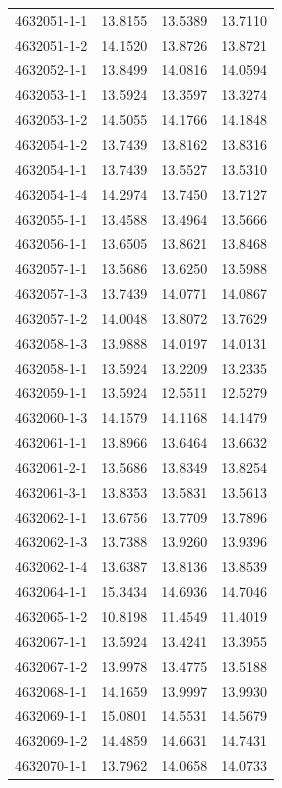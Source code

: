 \begin{longtable}{lrrr}
4632051-1-1 & 13.8155 & 13.5389 & 13.7110 \\
4632051-1-2 & 14.1520 & 13.8726 & 13.8721 \\
4632052-1-1 & 13.8499 & 14.0816 & 14.0594 \\
4632053-1-1 & 13.5924 & 13.3597 & 13.3274 \\
4632053-1-2 & 14.5055 & 14.1766 & 14.1848 \\
4632054-1-2 & 13.7439 & 13.8162 & 13.8316 \\
4632054-1-1 & 13.7439 & 13.5527 & 13.5310 \\
4632054-1-4 & 14.2974 & 13.7450 & 13.7127 \\
4632055-1-1 & 13.4588 & 13.4964 & 13.5666 \\
4632056-1-1 & 13.6505 & 13.8621 & 13.8468 \\
4632057-1-1 & 13.5686 & 13.6250 & 13.5988 \\
4632057-1-3 & 13.7439 & 14.0771 & 14.0867 \\
4632057-1-2 & 14.0048 & 13.8072 & 13.7629 \\
4632058-1-3 & 13.9888 & 14.0197 & 14.0131 \\
4632058-1-1 & 13.5924 & 13.2209 & 13.2335 \\
4632059-1-1 & 13.5924 & 12.5511 & 12.5279 \\
4632060-1-3 & 14.1579 & 14.1168 & 14.1479 \\
4632061-1-1 & 13.8966 & 13.6464 & 13.6632 \\
4632061-2-1 & 13.5686 & 13.8349 & 13.8254 \\
4632061-3-1 & 13.8353 & 13.5831 & 13.5613 \\
4632062-1-1 & 13.6756 & 13.7709 & 13.7896 \\
4632062-1-3 & 13.7388 & 13.9260 & 13.9396 \\
4632062-1-4 & 13.6387 & 13.8136 & 13.8539 \\
4632064-1-1 & 15.3434 & 14.6936 & 14.7046 \\
4632065-1-2 & 10.8198 & 11.4549 & 11.4019 \\
4632067-1-1 & 13.5924 & 13.4241 & 13.3955 \\
4632067-1-2 & 13.9978 & 13.4775 & 13.5188 \\
4632068-1-1 & 14.1659 & 13.9997 & 13.9930 \\
4632069-1-1 & 15.0801 & 14.5531 & 14.5679 \\
4632069-1-2 & 14.4859 & 14.6631 & 14.7431 \\
4632070-1-1 & 13.7962 & 14.0658 & 14.0733 \\

\end{longtable}
